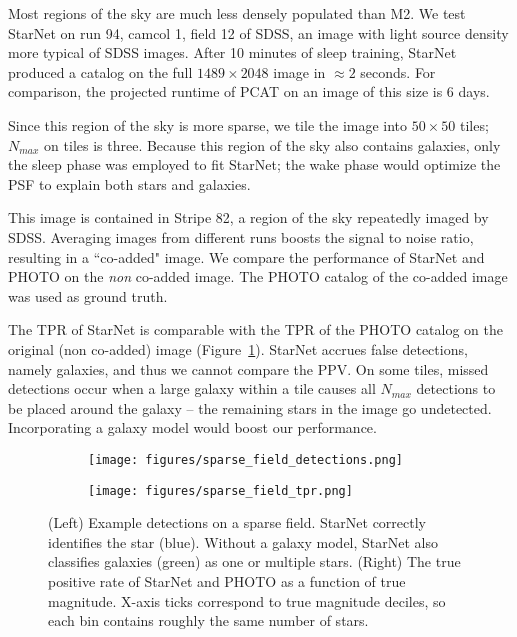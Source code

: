 Most regions of the sky are much less densely populated than M2. 
We test StarNet on run 94, camcol 1, field 12 of SDSS,
an image with light source density more typical of SDSS images.
After 10 minutes of sleep training, StarNet produced a catalog on the full $1489\times 2048$ image in $\approx2$ seconds. 
For comparison, the projected runtime of PCAT on an image of this size is 6 days.  

Since this region of the sky is more sparse, we tile the image into $50\times 50$ tiles; $N_{max}$ on tiles is three. 
Because this region of the sky also contains galaxies, only the sleep phase was employed to fit StarNet; 
the wake phase would optimize the PSF to explain both stars and galaxies. 

This image is contained in Stripe 82, a region of the sky repeatedly imaged by SDSS.
Averaging images from different runs boosts the signal to noise ratio, resulting in a ``co-added" image. 
We compare the performance of StarNet and PHOTO on the {\itshape non} co-added image. 
The PHOTO catalog of the co-added image was used as ground truth. 

The TPR of StarNet is comparable with the TPR of the PHOTO catalog on the original (non co-added) image (Figure~\ref{fig:sparse_field}). 
StarNet accrues false detections, namely galaxies, and thus we cannot compare the PPV. 
On some tiles, missed detections occur when a large galaxy within a tile causes all $N_{max}$ detections to be placed around the galaxy -- the remaining stars in the image go undetected. 
Incorporating a galaxy model would boost our performance. 


\begin{figure}
    \centering
    \begin{subfigure}{0.45\textwidth}
        \texttt{[image: figures/sparse\_field\_detections.png]}
        \subcaption{}
    \end{subfigure}
    \begin{subfigure}{0.54\textwidth}
        \texttt{[image: figures/sparse\_field\_tpr.png]}
        \subcaption{}
    \end{subfigure}
    \caption{(Left) Example detections on a sparse field. StarNet correctly identifies the star (blue). 
    Without a galaxy model, StarNet also classifies galaxies (green) as one or multiple stars.
    (Right) The true positive rate of StarNet and PHOTO as a function of true magnitude.
    X-axis ticks correspond to true magnitude deciles, so each bin contains roughly the same number of stars.}
    \label{fig:sparse_field}
\end{figure}
